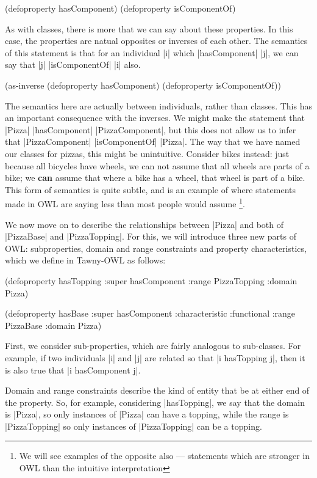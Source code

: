 \begin{tawnyhidden}
(defoproperty hasComponent)
(defoproperty isComponentOf)
\end{tawnyhidden}

As with classes, there is more that we can say about these properties. In this
case, the properties are natual opposites or inverses of each other. The
semantics of this statement is that for an individual |i| which |hasComponent|
|j|, we can say that |j| |isComponentOf| |i| also. 

\begin{tawny}
(as-inverse
 (defoproperty hasComponent)
 (defoproperty isComponentOf))
\end{tawny}

The semantics here are actually between individuals, rather than
classes. This has an important consequence with the inverses. We might
make the statement that |Pizza| |hasComponent| |PizzaComponent|, but
this does not allow us to infer that |PizzaComponent| |isComponentOf|
|Pizza|. The way that we have named our classes for pizzas, this might
be unintuitive. Consider bikes instead: just because all bicycles have
wheels, we can not assume that all wheels are parts of a bike; we
\textbf{can} assume that where a bike has a wheel, that wheel is part
of a bike. This form of semantics is quite subtle, and is an example
of where statements made in OWL are saying less than most people would
assume \footnote{We will see examples of the opposite also ---
  statements which are stronger in OWL than the intuitive
  interpretation}.

We now move on to describe the relationships between |Pizza| and both of
|PizzaBase| and |PizzaTopping|. For this, we will introduce three new parts of
OWL: subproperties, domain and range constraints and property characteristics,
which we define in Tawny-OWL as follows:

\begin{tawny}
(defoproperty hasTopping
  :super hasComponent
  :range PizzaTopping
  :domain Pizza)

(defoproperty hasBase
  :super hasComponent
  :characteristic :functional
  :range PizzaBase
  :domain Pizza)
\end{tawny}

First, we consider sub-properties, which are fairly analogous to sub-classes.
For example, if two individuals |i| and |j| are related so that
|i hasTopping j|, then it is also true that |i hasComponent j|.

Domain and range constraints describe the kind of entity that be at either end
of the property. So, for example, considering |hasTopping|, we say that the
domain is |Pizza|, so only instances of |Pizza| can have a topping, while the
range is |PizzaTopping| so only instances of |PizzaTopping| can be a topping. 

